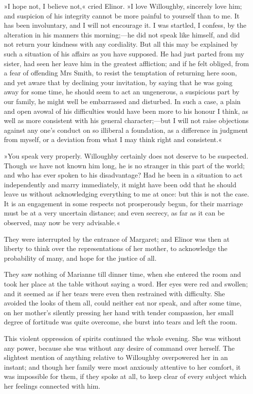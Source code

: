 »I hope not, I believe not,« cried Elinor. »I love Willoughby, sincerely love him; and suspicion of his integrity cannot be more painful to yourself than to me. It has been involuntary, and I will not encourage it. I was startled, I confess, by the alteration in his manners this morning;—he did not speak like himself, and did not return your kindness with any cordiality. But all this may be explained by such a situation of his affairs as you have supposed. He had just parted from my sister, had seen her leave him in the greatest affliction; and if he felt obliged, from a fear of offending Mrs Smith, to resist the temptation of returning here soon, and yet aware that by declining your invitation, by saying that he was going away for some time, he should seem to act an ungenerous, a suspicious part by our family, he might well be embarrassed and disturbed. In such a case, a plain and open avowal of his difficulties would have been more to his honour I think, as well as more consistent with his general character;—but I will not raise objections against any one’s conduct on so illiberal a foundation, as a difference in judgment from myself, or a deviation from what I may think right and consistent.«

»You speak very properly. Willoughby certainly does not deserve to be suspected. Though \textit{we} have not known him long, he is no stranger in this part of the world; and who has ever spoken to his disadvantage? Had he been in a situation to act independently and marry immediately, it might have been odd that he should leave us without acknowledging everything to me at once: but this is not the case. It is an engagement in some respects not prosperously begun, for their marriage must be at a very uncertain distance; and even secrecy, as far as it can be observed, may now be very advisable.«

They were interrupted by the entrance of Margaret; and Elinor was then at liberty to think over the representations of her mother, to acknowledge the probability of many, and hope for the justice of all.

They saw nothing of Marianne till dinner time, when she entered the room and took her place at the table without saying a word. Her eyes were red and swollen; and it seemed as if her tears were even then restrained with difficulty. She avoided the looks of them all, could neither eat nor speak, and after some time, on her mother’s silently pressing her hand with tender compassion, her small degree of fortitude was quite overcome, she burst into tears and left the room.

This violent oppression of spirits continued the whole evening. She was without any power, because she was without any desire of command over herself. The slightest mention of anything relative to Willoughby overpowered her in an instant; and though her family were most anxiously attentive to her comfort, it was impossible for them, if they spoke at all, to keep clear of every subject which her feelings connected with him.